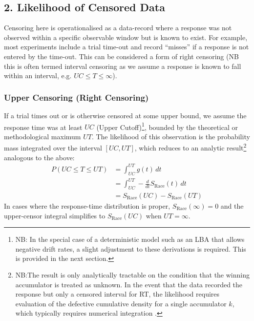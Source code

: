 \documentclass[12pt,a4paper,one side]{article}
\begin{document}
\subsection*{2. Likelihood of Censored Data}

Censoring here is operationalised as a data-record where a response was not observed within a specific observable window but is known to exist. For example, most experiments include a trial time-out and record ``misses'' if a response is not entered by the time-out. This can be considered a form of right censoring (NB this is often termed interval censoring as we assume a response is known to fall within an interval, e.g. $UC \leq T \leq \infty $).

\subsubsection*{Upper Censoring (Right Censoring)}
If a trial times out or is otherwise censored at some upper bound, we assume the response time was at least $UC$ (Upper Cutoff)\footnote{\noindent NB: In the special case of a deterministic model such as an LBA that allows negative drift rates, a slight adjustment to these derivations is required. This is provided in the next section.}, bounded by the theoretical or methodological maximum $UT$. The likelihood of this observation is the probability mass integrated over the interval $[UC, UT]$, which reduces to an analytic result\footnote{NB:The result is only analytically tractable on the condition that the winning accumulator is treated as unknown. In the event that the data recorded the response but only a censored interval for RT, the likelihood requires evaluation of the defective cumulative density for a single accumulator $k$, which typically requires numerical integration \parencite{brown2008simplest}.} analogous to the above:
\begin{align}
    P(UC \leq T \leq UT) &= \int_{UC}^{UT} g(t) \, dt \nonumber \\
    &= \int_{UC}^{UT} - \frac{d}{dt} S_{\text{Race}}(t) \, dt \nonumber \\
    &= S_{\text{Race}}(UC) - S_{\text{Race}}(UT)
    \label{Eq:survivor_difference}
\end{align}
In cases where the response-time distribution is proper, $S_{\text{Race}}(\infty) = 0$ and the upper-censor integral simplifies to $S_{\text{Race}}(UC)$ when $UT=\infty$.
\end{document}
